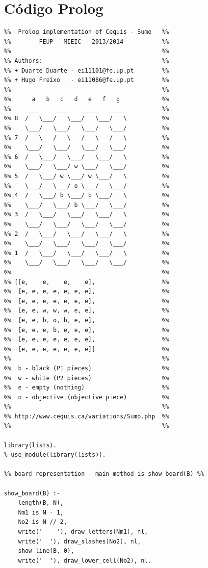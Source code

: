\documentclass[a4paper]{article}
\begin{document}
\section{Código Prolog}
\begin{verbatim}
%%  Prolog implementation of Cequis - Sumo   %%
%%        FEUP - MIEIC - 2013/2014           %%
%%                                           %%
%% Authors:                                  %%
%% + Duarte Duarte - ei11101@fe.up.pt        %%
%% + Hugo Freixo   - ei11086@fe.up.pt        %%
%%                                           %%
%%      a   b   c   d   e   f   g            %%
%%     ___     ___     ___     ___           %%
%% 8  /   \___/   \___/   \___/   \          %%
%%    \___/   \___/   \___/   \___/          %%
%% 7  /   \___/   \___/   \___/   \          %%
%%    \___/   \___/   \___/   \___/          %%
%% 6  /   \___/   \___/   \___/   \          %%
%%    \___/   \___/ w \___/   \___/          %%
%% 5  /   \___/ w \___/ w \___/   \          %%
%%    \___/   \___/ o \___/   \___/          %%
%% 4  /   \___/ b \___/ b \___/   \          %%
%%    \___/   \___/ b \___/   \___/          %%
%% 3  /   \___/   \___/   \___/   \          %%
%%    \___/   \___/   \___/   \___/          %%
%% 2  /   \___/   \___/   \___/   \          %%
%%    \___/   \___/   \___/   \___/          %%
%% 1  /   \___/   \___/   \___/   \          %%
%%    \___/   \___/   \___/   \___/          %%
%%                                           %%
%% [[e,    e,    e,    e],                   %%
%%  [e, e, e, e, e, e, e],                   %%
%%  [e, e, e, e, e, e, e],                   %%
%%  [e, e, w, w, w, e, e],                   %%
%%  [e, e, b, o, b, e, e],                   %%
%%  [e, e, e, b, e, e, e],                   %%
%%  [e, e, e, e, e, e, e],                   %%
%%  [e, e, e, e, e, e, e]]                   %%
%%                                           %%
%%  b - black (P1 pieces)                    %%
%%  w - white (P2 pieces)                    %%
%%  e - empty (nothing)                      %%
%%  o - objective (objective piece)          %%
%%                                           %%
%% http://www.cequis.ca/variations/Sumo.php  %%
%%                                           %%

library(lists).
% use_module(library(lists)).

%% board representation - main method is show_board(B) %%

show_board(B) :-
    length(B, N),
    Nm1 is N - 1,
    No2 is N // 2,
    write('    '), draw_letters(Nm1), nl,
    write('  '), draw_slashes(No2), nl,
    show_line(B, 0),
    write('  '), draw_lower_cell(No2), nl.


\end{verbatim}
\end{document}
